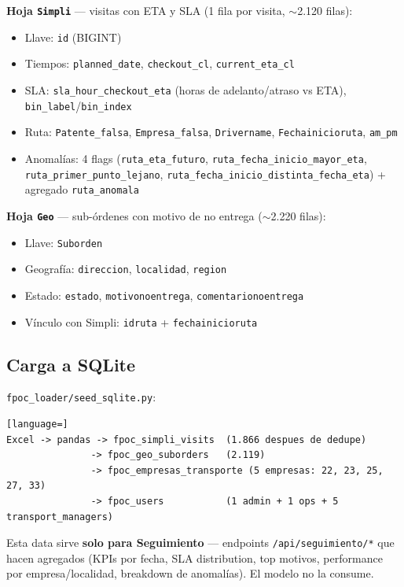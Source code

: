 \documentclass[11pt,a4paper]{article}
\begin{document}
\textbf{Hoja \texttt{Simpli}} --- visitas con ETA y SLA (1 fila por visita, $\sim$2.120 filas):
\begin{itemize}
  \item Llave: \texttt{id} (BIGINT)
  \item Tiempos: \texttt{planned\_date}, \texttt{checkout\_cl}, \texttt{current\_eta\_cl}
  \item SLA: \texttt{sla\_hour\_checkout\_eta} (horas de adelanto/atraso vs ETA), \texttt{bin\_label}/\texttt{bin\_index}
  \item Ruta: \texttt{Patente\_falsa}, \texttt{Empresa\_falsa}, \texttt{Drivername}, \texttt{Fechainicioruta}, \texttt{am\_pm}
  \item Anomalías: 4 flags (\texttt{ruta\_eta\_futuro}, \texttt{ruta\_fecha\_inicio\_mayor\_eta}, \texttt{ruta\_primer\_punto\_lejano}, \texttt{ruta\_fecha\_inicio\_distinta\_fecha\_eta}) + agregado \texttt{ruta\_anomala}
\end{itemize}

\textbf{Hoja \texttt{Geo}} --- sub-órdenes con motivo de no entrega ($\sim$2.220 filas):
\begin{itemize}
  \item Llave: \texttt{Suborden}
  \item Geografía: \texttt{direccion}, \texttt{localidad}, \texttt{region}
  \item Estado: \texttt{estado}, \texttt{motivonoentrega}, \texttt{comentarionoentrega}
  \item Vínculo con Simpli: \texttt{idruta} + \texttt{fechainicioruta}
\end{itemize}

\subsection{Carga a SQLite}

\texttt{fpoc\_loader/seed\_sqlite.py}:

\begin{lstlisting}[language=]
Excel -> pandas -> fpoc_simpli_visits  (1.866 despues de dedupe)
               -> fpoc_geo_suborders   (2.119)
               -> fpoc_empresas_transporte (5 empresas: 22, 23, 25, 27, 33)
               -> fpoc_users           (1 admin + 1 ops + 5 transport_managers)
\end{lstlisting}

Esta data sirve \textbf{solo para Seguimiento} --- endpoints \texttt{/api/seguimiento/*} que hacen agregados (KPIs por fecha, SLA distribution, top motivos, performance por empresa/localidad, breakdown de anomalías). El modelo no la consume.
\end{document}
